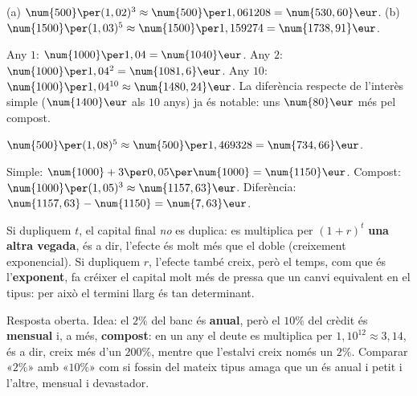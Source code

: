 \begin{solucions}
\begin{sollist}
  \item (a) $\num{500}\per (1,02)^3\approx\num{500}\per 1,061208=\num{530,60}\eur$.
        \quad (b) $\num{1500}\per (1,03)^5\approx\num{1500}\per 1,159274=\num{1738,91}\eur$.
  \item Any $1$: $\num{1000}\per 1,04=\num{1040}\eur$. Any $2$:
        $\num{1000}\per 1,04^2=\num{1081,6}\eur$. Any $10$:
        $\num{1000}\per 1,04^{10}\approx\num{1480,24}\eur$. La diferència respecte de
        l'interès simple ($\num{1400}\eur$ als $10$ anys) ja és notable: uns
        $\num{80}\eur$ més pel compost.
  \item $\num{500}\per (1,08)^5\approx\num{500}\per 1,469328=\num{734,66}\eur$.
  \item Simple: $\num{1000}+3\per 0,05\per\num{1000}=\num{1150}\eur$. Compost:
        $\num{1000}\per (1,05)^3\approx\num{1157,63}\eur$. Diferència:
        $\num{1157,63}-\num{1150}=\num{7,63}\eur$.
  \item Si dupliquem $t$, el capital final \emph{no} es duplica: es multiplica per
        $(1+r)^t$ \textbf{una altra vegada}, és a dir, l'efecte és molt més que el
        doble (creixement exponencial). Si dupliquem $r$, l'efecte també creix, però el
        temps, com que és l'\textbf{exponent}, fa créixer el capital molt més de pressa
        que un canvi equivalent en el tipus: per això el termini llarg és tan
        determinant.
  \item Resposta oberta. Idea: el $2\%$ del banc és \textbf{anual}, però el $10\%$ del
        crèdit és \textbf{mensual} i, a més, \textbf{compost}: en un any el deute es
        multiplica per $1,10^{12}\approx 3,14$, és a dir, creix més d'un $200\%$, mentre
        que l'estalvi creix només un $2\%$. Comparar «$2\%$» amb «$10\%$» com si fossin
        del mateix tipus amaga que un és anual i petit i l'altre, mensual i devastador.
\end{sollist}
\end{solucions}
